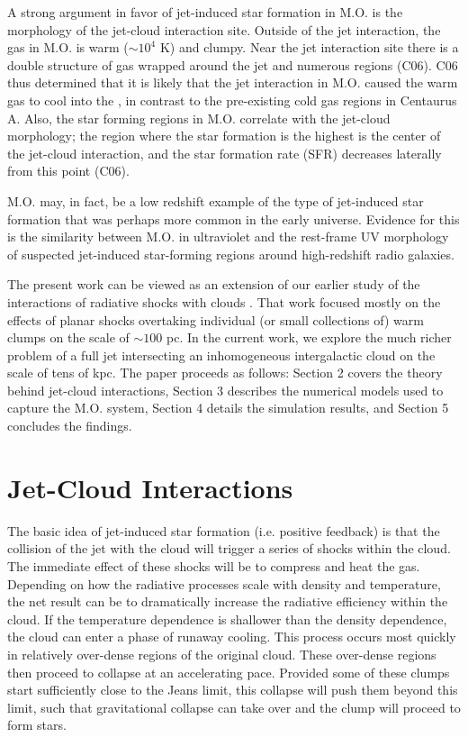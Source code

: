 \documentclass{aastex6}
\begin{document}
A strong argument in favor of jet-induced star formation in M.O. is the morphology of the jet-cloud interaction site. Outside of the jet interaction, the gas in M.O. is warm ($\sim 10^4$ K) and clumpy. Near the jet interaction site there is a double structure of  gas wrapped around the jet and numerous  regions (C06). C06 thus determined that it is likely that the jet interaction in M.O. caused the warm gas to cool into the , in contrast to the pre-existing cold gas regions in Centaurus A. Also, the star forming regions in M.O. correlate with the jet-cloud morphology; the region where the star formation is the highest is the center of the jet-cloud interaction, and the star formation rate (SFR) decreases laterally from this point (C06). 

M.O. may, in fact, be a low redshift example of the type of jet-induced star formation that was perhaps more common in the early universe. Evidence for this is the similarity between M.O. in ultraviolet and the rest-frame UV morphology of suspected jet-induced star-forming regions around high-redshift radio galaxies.

The present work can be viewed as an extension of our earlier study of the interactions of radiative shocks with clouds \citep{Fragile04}. That work focused mostly on the effects of planar shocks overtaking individual (or small collections of) warm clumps on the scale of $\sim 100$ pc.  In the current work, we explore the much richer problem of a full jet intersecting an inhomogeneous intergalactic cloud on the scale of tens of kpc. The paper proceeds as follows: Section 2 covers the theory behind jet-cloud interactions, Section 3 describes the numerical models used to capture the M.O. system, Section 4 details the simulation results, and Section 5 concludes the findings.


\section{Jet-Cloud Interactions}
\label{sec:jetcloud}

The basic idea of jet-induced star formation (i.e. positive feedback) is that the collision of the jet with the cloud will trigger a series of shocks within the cloud.  The immediate effect of these shocks will be to compress and heat the gas. Depending on how the radiative processes scale with density and temperature, the net result can be to dramatically increase the radiative efficiency within the cloud. If the temperature dependence is shallower than the density dependence, the cloud can enter a phase of runaway cooling.  This process occurs most quickly in relatively over-dense regions of the original cloud.  These over-dense regions then proceed to collapse at an accelerating pace.  Provided some of these clumps start sufficiently close to the Jeans limit, this collapse will push them beyond this limit, such that gravitational collapse can take over and the clump will proceed to form stars. 
\end{document}

